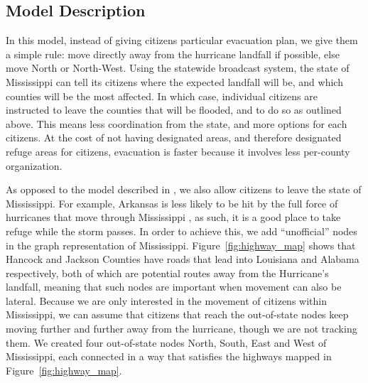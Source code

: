 \documentclass[titlepage]{article}
\begin{document}
  \subsection{Model Description}
    \par In this model, instead of giving citizens particular evacuation plan, we give them a simple rule: move directly away from the hurricane landfall if possible, else move North or North-West. Using the statewide broadcast system, the state of Mississippi can tell its citizens where the expected landfall will be, and which counties will be the most affected. In which case, individual citizens are instructed to leave the counties that will be flooded, and to do so as outlined above. This means less coordination from the state, and more options for each citizens. At the cost of not having designated areas, and therefore designated refuge areas for citizens, evacuation is faster because it involves less per-county organization.\\
    \par As opposed to the model described in , we also allow citizens to leave the state of Mississippi. For example, Arkansas is less likely to be hit by the full force of hurricanes that move through Mississippi \cite{5news}, as such, it is a good place to take refuge while the storm passes. In order to achieve this, we add ``unofficial'' nodes in the graph representation of Mississippi. Figure~\ref{fig:highway_map} shows that Hancock and Jackson Counties have roads that lead into Louisiana and Alabama respectively, both of which are potential routes away from the Hurricane's landfall, meaning that such nodes are important when movement can also be lateral. Because we are only interested in the movement of citizens within Mississippi, we can assume that citizens that reach the out-of-state nodes keep moving further and further away from the hurricane, though we are not tracking them. We created four out-of-state nodes North, South, East and West of Mississippi, each connected in a way that satisfies the highways mapped in Figure~\ref{fig:highway_map}.
\end{document}
